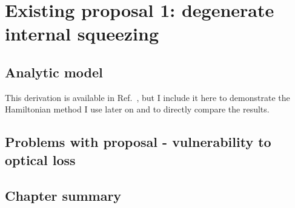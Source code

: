 \chapter{Existing proposal 1: degenerate internal squeezing}




\section{Analytic model}

This derivation is available in Ref.~\cite{}, but I include it here to demonstrate the Hamiltonian method I use later on and to directly compare the results. 



\section{Problems with proposal - vulnerability to optical loss}


\section{Chapter summary}

